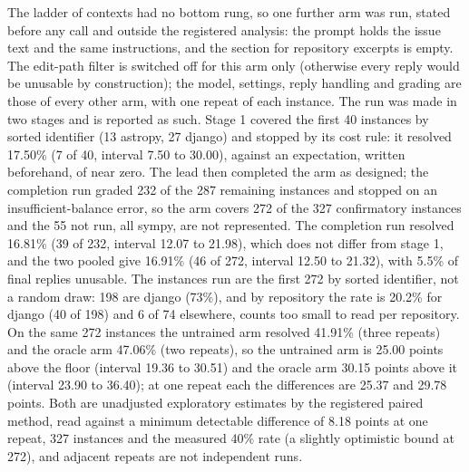 \documentclass[10pt,twocolumn]{article}
\makeatletter
\renewcommand\paragraph{\@startsection{paragraph}{4}{\z@}{3pt}{-0.5em}{\normalfont\bfseries}}
\makeatother
\begin{document}
\paragraph{Exploratory no-retrieval floor arm.} The ladder of contexts had no bottom rung, so one further arm was run, stated before any call and outside the registered analysis: the prompt holds the issue text and the same instructions, and the section for repository excerpts is empty. The edit-path filter is switched off for this arm only (otherwise every reply would be unusable by construction); the model, settings, reply handling and grading are those of every other arm, with one repeat of each instance. %
The run was made in two stages and is reported as such. Stage 1 covered the first 40 instances by sorted identifier (13 astropy, 27 django) and stopped by its cost rule: it resolved 17.50\% (7 of 40, interval 7.50 to 30.00), against an expectation, written beforehand, of near zero. %
The lead then completed the arm as designed; the completion run graded 232 of the 287 remaining instances and stopped on an insufficient-balance error, so the arm covers 272 of the 327 confirmatory instances and the 55 not run, all sympy, are not represented. %
The completion run resolved 16.81\% (39 of 232, interval 12.07 to 21.98), which does not differ from stage 1, and the two pooled give 16.91\% (46 of 272, interval 12.50 to 21.32), with 5.5\% of final replies unusable. %
The instances run are the first 272 by sorted identifier, not a random draw: 198 are django (73\%), and by repository the rate is 20.2\% for django (40 of 198) and 6 of 74 elsewhere, counts too small to read per repository. %
On the same 272 instances the untrained arm resolved 41.91\% (three repeats) and the oracle arm 47.06\% (two repeats), so the untrained arm is 25.00 points above the floor (interval 19.36 to 30.51) and the oracle arm 30.15 points above it (interval 23.90 to 36.40); at one repeat each the differences are 25.37 and 29.78 points. Both are unadjusted exploratory estimates by the registered paired method, read against a minimum detectable difference of 8.18 points at one repeat, 327 instances and the measured 40\% rate (a slightly optimistic bound at 272), and adjacent repeats are not independent runs. %
\end{document}
